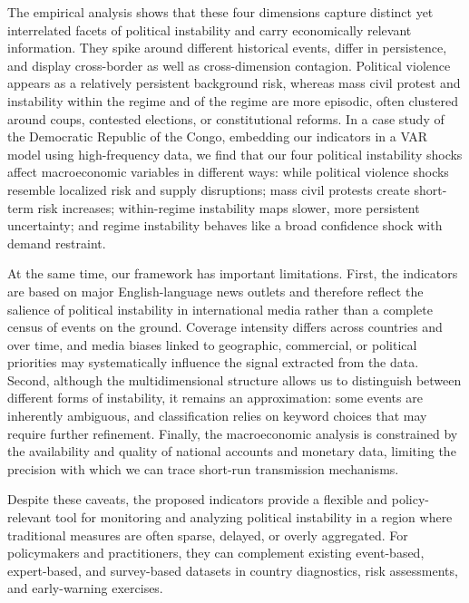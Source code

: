 \documentclass[12pt,a4paper,fleqn]{article}
\begin{document}
The empirical analysis shows that these four dimensions capture distinct yet interrelated facets of political instability and carry economically relevant information. They spike around different historical events, differ in persistence, and display cross-border as well as cross-dimension contagion. Political violence appears as a relatively persistent background risk, whereas mass civil protest and instability within the regime and of the regime are more episodic, often clustered around coups, contested elections, or constitutional reforms. %
In a case study of the Democratic Republic of the Congo, embedding our indicators in a VAR model using high-frequency data, we find that our four political instability shocks affect macroeconomic variables in different ways: while political violence shocks resemble localized risk and supply disruptions; mass civil protests create short-term risk increases; within-regime instability maps slower, more persistent uncertainty; and regime instability behaves like a broad confidence shock with demand restraint.


At the same time, our framework has important limitations. First, the indicators are based on major English-language news outlets and therefore reflect the salience of political instability in international media rather than a complete census of events on the ground. Coverage intensity differs across countries and over time, and media biases linked to geographic, commercial, or political priorities may systematically influence the signal extracted from the data. Second, although the multidimensional structure allows us to distinguish between different forms of instability, it remains an approximation: some events are inherently ambiguous, and classification relies on keyword choices that may require further refinement. Finally, the macroeconomic analysis is constrained by the availability and quality of national accounts and monetary data, limiting the precision with which we can trace short-run transmission mechanisms. 


Despite these caveats, the proposed indicators provide a flexible and policy-relevant tool for monitoring and analyzing political instability in a region where traditional measures are often sparse, delayed, or overly aggregated. For policymakers and practitioners, they can complement existing event-based, expert-based, and survey-based datasets in country diagnostics, risk assessments, and early-warning exercises.
\end{document}
